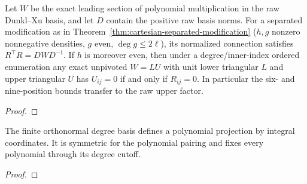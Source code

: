 \begin{theorem}
\label{thm:disk-modification-lu}
\leanok
Let $W$ be the exact leading section of polynomial multiplication in the raw
Dunkl--Xu basis, and let $D$ contain the positive raw basis norms. For a separated
modification as in Theorem~\ref{thm:cartesian-separated-modification} ($h,g$
nonzero nonnegative densities, $g$ even, $\deg g\le2\ell$), its normalized
connection satisfies $R^\top R=DWD^{-1}$.
If $h$ is moreover even, then under a degree/inner-index ordered enumeration
any exact unpivoted $W=LU$ with unit lower triangular $L$ and upper triangular
$U$ has $U_{ij}=0$ if and only if $R_{ij}=0$.
In particular the six- and nine-position bounds transfer to the raw upper factor.
\end{theorem}
\begin{proof}
\leanok
\end{proof}

\begin{supporting}
\begin{theorem}
\label{thm:polynomial-integral-projection}
\leanok
The finite orthonormal degree basis defines a polynomial projection by integral
coordinates. It is symmetric for the polynomial pairing and fixes every
polynomial through its degree cutoff.
\end{theorem}
\begin{proof}
\leanok
\end{proof}
\end{supporting}


